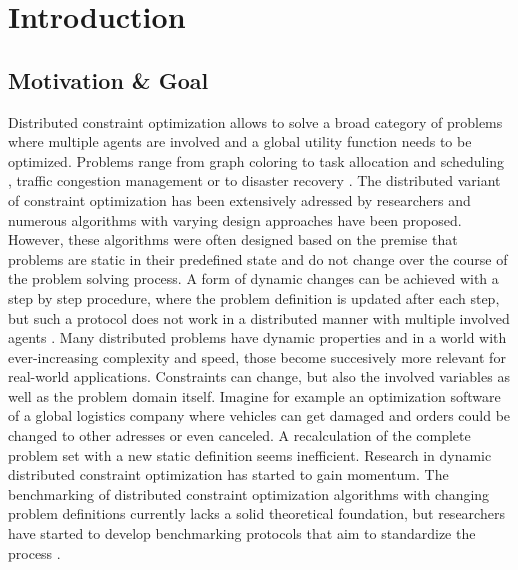 \chapter{Introduction}

\section{Motivation \& Goal}
Distributed constraint optimization allows to solve a broad category of problems where multiple agents are involved and a global utility function needs to be optimized. Problems range from graph coloring \cite{Modi2005} to task allocation and scheduling \cite{Zhang}, traffic congestion management \cite{Leeuwen2002} or to disaster recovery \cite{J1999}. The distributed variant of constraint optimization has been extensively adressed by researchers and numerous algorithms with varying design approaches have been proposed. However, these algorithms were often designed based on the premise that problems are static in their predefined state and do not change over the course of the problem solving process. A form of dynamic changes can be achieved with a step by step procedure, where the problem definition is updated after each step, but such a protocol does not work in a distributed manner with multiple involved agents \cite{Petcua}. Many distributed problems have dynamic properties and in a world with ever-increasing complexity and speed, those become succesively more relevant for real-world applications. Constraints can change, but also the involved variables as well as the problem domain itself. Imagine for example an optimization software of a global logistics company where vehicles can get damaged and orders could be changed to other adresses or even canceled. A recalculation of the complete problem set with a new  static definition seems inefficient. Research in dynamic distributed constraint optimization has started to gain momentum. The benchmarking of distributed constraint optimization  algorithms with changing problem definitions currently lacks a solid theoretical foundation, but researchers have started to develop benchmarking protocols that aim to standardize the process \cite{Maillera}. 
\newline \newline

